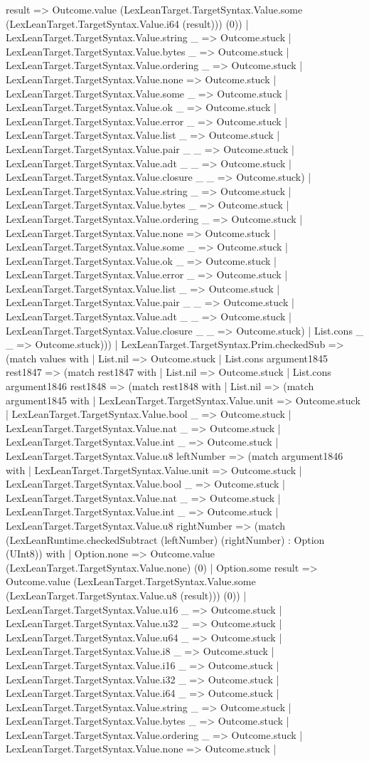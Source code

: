 \documentclass[11pt]{article}
\begin{document}
result => Outcome.value (LexLeanTarget.TargetSyntax.Value.some (LexLeanTarget.TargetSyntax.Value.i64 (result))) (0)) | LexLeanTarget.TargetSyntax.Value.string \_ => Outcome.stuck | LexLeanTarget.TargetSyntax.Value.bytes \_ => Outcome.stuck | LexLeanTarget.TargetSyntax.Value.ordering \_ => Outcome.stuck | LexLeanTarget.TargetSyntax.Value.none => Outcome.stuck | LexLeanTarget.TargetSyntax.Value.some \_ => Outcome.stuck | LexLeanTarget.TargetSyntax.Value.ok \_ => Outcome.stuck | LexLeanTarget.TargetSyntax.Value.error \_ => Outcome.stuck | LexLeanTarget.TargetSyntax.Value.list \_ => Outcome.stuck | LexLeanTarget.TargetSyntax.Value.pair \_ \_ => Outcome.stuck | LexLeanTarget.TargetSyntax.Value.adt \_ \_ => Outcome.stuck | LexLeanTarget.TargetSyntax.Value.closure \_ \_ => Outcome.stuck) | LexLeanTarget.TargetSyntax.Value.string \_ => Outcome.stuck | LexLeanTarget.TargetSyntax.Value.bytes \_ => Outcome.stuck | LexLeanTarget.TargetSyntax.Value.ordering \_ => Outcome.stuck | LexLeanTarget.TargetSyntax.Value.none => Outcome.stuck | LexLeanTarget.TargetSyntax.Value.some \_ => Outcome.stuck | LexLeanTarget.TargetSyntax.Value.ok \_ => Outcome.stuck | LexLeanTarget.TargetSyntax.Value.error \_ => Outcome.stuck | LexLeanTarget.TargetSyntax.Value.list \_ => Outcome.stuck | LexLeanTarget.TargetSyntax.Value.pair \_ \_ => Outcome.stuck | LexLeanTarget.TargetSyntax.Value.adt \_ \_ => Outcome.stuck | LexLeanTarget.TargetSyntax.Value.closure \_ \_ => Outcome.stuck) | List.cons \_ \_ => Outcome.stuck))) | LexLeanTarget.TargetSyntax.Prim.checkedSub => (match values with | List.nil => Outcome.stuck | List.cons argument1845 rest1847 => (match rest1847 with | List.nil => Outcome.stuck | List.cons argument1846 rest1848 => (match rest1848 with | List.nil => (match argument1845 with | LexLeanTarget.TargetSyntax.Value.unit => Outcome.stuck | LexLeanTarget.TargetSyntax.Value.bool \_ => Outcome.stuck | LexLeanTarget.TargetSyntax.Value.nat \_ => Outcome.stuck | LexLeanTarget.TargetSyntax.Value.int \_ => Outcome.stuck | LexLeanTarget.TargetSyntax.Value.u8 leftNumber => (match argument1846 with | LexLeanTarget.TargetSyntax.Value.unit => Outcome.stuck | LexLeanTarget.TargetSyntax.Value.bool \_ => Outcome.stuck | LexLeanTarget.TargetSyntax.Value.nat \_ => Outcome.stuck | LexLeanTarget.TargetSyntax.Value.int \_ => Outcome.stuck | LexLeanTarget.TargetSyntax.Value.u8 rightNumber => (match (LexLeanRuntime.checkedSubtract (leftNumber) (rightNumber) : Option (UInt8)) with | Option.none => Outcome.value (LexLeanTarget.TargetSyntax.Value.none) (0) | Option.some result => Outcome.value (LexLeanTarget.TargetSyntax.Value.some (LexLeanTarget.TargetSyntax.Value.u8 (result))) (0)) | LexLeanTarget.TargetSyntax.Value.u16 \_ => Outcome.stuck | LexLeanTarget.TargetSyntax.Value.u32 \_ => Outcome.stuck | LexLeanTarget.TargetSyntax.Value.u64 \_ => Outcome.stuck | LexLeanTarget.TargetSyntax.Value.i8 \_ => Outcome.stuck | LexLeanTarget.TargetSyntax.Value.i16 \_ => Outcome.stuck | LexLeanTarget.TargetSyntax.Value.i32 \_ => Outcome.stuck | LexLeanTarget.TargetSyntax.Value.i64 \_ => Outcome.stuck | LexLeanTarget.TargetSyntax.Value.string \_ => Outcome.stuck | LexLeanTarget.TargetSyntax.Value.bytes \_ => Outcome.stuck | LexLeanTarget.TargetSyntax.Value.ordering \_ => Outcome.stuck | LexLeanTarget.TargetSyntax.Value.none => Outcome.stuck | 
\end{document}
